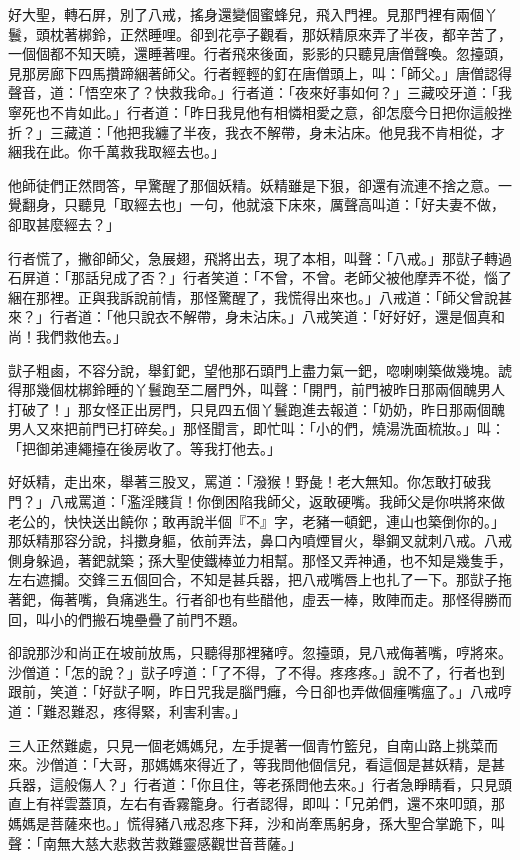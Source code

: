 好大聖，轉石屏，別了八戒，搖身還變個蜜蜂兒，飛入門裡。見那門裡有兩個丫鬟，頭枕著梆鈴，正然睡哩。卻到花亭子觀看，那妖精原來弄了半夜，都辛苦了，一個個都不知天曉，還睡著哩。行者飛來後面，影影的只聽見唐僧聲喚。忽擡頭，見那房廊下四馬攢蹄綑著師父。行者輕輕的釘在唐僧頭上，叫：「師父。」唐僧認得聲音，道：「悟空來了？快救我命。」行者道：「夜來好事如何？」三藏咬牙道：「我寧死也不肯如此。」行者道：「昨日我見他有相憐相愛之意，卻怎麼今日把你這般挫折？」三藏道：「他把我纏了半夜，我衣不解帶，身未沾床。他見我不肯相從，才綑我在此。你千萬救我取經去也。」

他師徒們正然問答，早驚醒了那個妖精。妖精雖是下狠，卻還有流連不捨之意。一覺翻身，只聽見「取經去也」一句，他就滾下床來，厲聲高叫道：「好夫妻不做，卻取甚麼經去？」

行者慌了，撇卻師父，急展翅，飛將出去，現了本相，叫聲：「八戒。」那獃子轉過石屏道：「那話兒成了否？」行者笑道：「不曾，不曾。老師父被他摩弄不從，惱了綑在那裡。正與我訴說前情，那怪驚醒了，我慌得出來也。」八戒道：「師父曾說甚來？」行者道：「他只說衣不解帶，身未沾床。」八戒笑道：「好好好，還是個真和尚！我們救他去。」

獃子粗鹵，不容分說，舉釘鈀，望他那石頭門上盡力氣一鈀，唿喇喇築做幾塊。諕得那幾個枕梆鈴睡的丫鬟跑至二層門外，叫聲：「開門，前門被昨日那兩個醜男人打破了！」那女怪正出房門，只見四五個丫鬟跑進去報道：「奶奶，昨日那兩個醜男人又來把前門已打碎矣。」那怪聞言，即忙叫：「小的們，燒湯洗面梳妝。」叫：「把御弟連繩擡在後房收了。等我打他去。」

好妖精，走出來，舉著三股叉，罵道：「潑猴！野彘！老大無知。你怎敢打破我門？」八戒罵道：「濫淫賤貨！你倒困陷我師父，返敢硬嘴。我師父是你哄將來做老公的，快快送出饒你；敢再說半個『不』字，老豬一頓鈀，連山也築倒你的。」那妖精那容分說，抖擻身軀，依前弄法，鼻口內噴煙冒火，舉鋼叉就刺八戒。八戒側身躲過，著鈀就築；孫大聖使鐵棒並力相幫。那怪又弄神通，也不知是幾隻手，左右遮攔。交鋒三五個回合，不知是甚兵器，把八戒嘴唇上也扎了一下。那獃子拖著鈀，侮著嘴，負痛逃生。行者卻也有些醋他，虛丟一棒，敗陣而走。那怪得勝而回，叫小的們搬石塊壘疊了前門不題。

卻說那沙和尚正在坡前放馬，只聽得那裡豬哼。忽擡頭，見八戒侮著嘴，哼將來。沙僧道：「怎的說？」獃子哼道：「了不得，了不得。疼疼疼。」說不了，行者也到跟前，笑道：「好獃子啊，昨日咒我是腦門癰，今日卻也弄做個瘇嘴瘟了。」八戒哼道：「難忍難忍，疼得緊，利害利害。」

三人正然難處，只見一個老媽媽兒，左手提著一個青竹籃兒，自南山路上挑菜而來。沙僧道：「大哥，那媽媽來得近了，等我問他個信兒，看這個是甚妖精，是甚兵器，這般傷人？」行者道：「你且住，等老孫問他去來。」行者急睜睛看，只見頭直上有祥雲蓋頂，左右有香霧籠身。行者認得，即叫：「兄弟們，還不來叩頭，那媽媽是菩薩來也。」慌得豬八戒忍疼下拜，沙和尚牽馬躬身，孫大聖合掌跪下，叫聲：「南無大慈大悲救苦救難靈感觀世音菩薩。」

